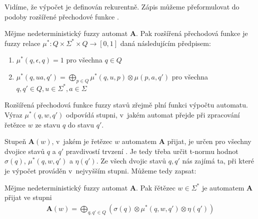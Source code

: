 Vidíme, že výpočet je definován rekurentně. Zápis můžeme přeformulovat do podoby rozšířené přechodové funkce \cite{IgnCirBog-DetFuzAutMemValComResLat}.

\begin{definition}\label{def-RozPreFunFuzzStav}
 Mějme nedeterministický fuzzy automat $\mathbf{A}$. Pak rozšířená přechodová funkce je fuzzy relace $\mu^*: Q \times \Sigma^* \times Q \rightarrow [0,1]$ daná následujícím předpisem:
 
 \begin{enumerate}
  \item $\mu^*(q, \epsilon, q) = 1$ pro všechna $q \in Q$
  \item $\mu^*(q, u a, q') =  \bigoplus_{p \in Q} \mu^*(q, u, p) \otimes \mu(p, a, q')$ pro všechna $q, q' \in Q, u \in \Sigma^*, a \in \Sigma$
 \end{enumerate}
\end{definition}

Rozšířená přechodová funkce fuzzy stavů zřejmě plní funkci výpočtu automatu. Výraz $\mu^*(q, w, q')$ odpovídá stupni, v~jakém automat přejde při zpracování řetězce $w$ ze stavu $q$ do stavu $q'$. 

Stupeň $\mathbf{A}(w)$, v~jakém je řetězec $w$ automatem $\mathbf{A}$ přijat, je určen pro všechny dvojice stavů $q$ a $q'$ pravdivostí trvzení . Je tedy třeba určit t-normu hodnot $\sigma(q)$, $\mu^*(q, w, q')$ a $\eta(q')$. Ze všech dvojic stavů $q, q'$ nás zajímá ta, při které je výpočet prováděn v~nejvyšším stupni. Můžeme tedy zapsat:

\begin{definition}\label{def-RetPriAut}
 Mějme nedeterministický fuzzy automat $\mathbf{A}$. Pak řětězec $w \in \Sigma^*$ je automatem $\mathbf{A}$ přijat ve stupni
 \begin{align} \label{eq-RetPriAut}
  \mathbf{A}(w) = \bigoplus_{q, q' \in Q} (\sigma(q) \otimes \mu^*(q, w, q') \otimes \eta(q'))
 \end{align}
\end{definition}

